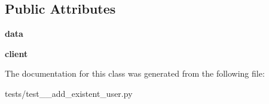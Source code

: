 \subsection*{Public Attributes}
\begin{DoxyCompactItemize}
\item 
\mbox{\label{classtests_1_1test__2__add__existent__user_1_1_test_user_routes_af61f77064477f9fc6be8a942b610274a}} 
{\bfseries data}
\item 
\mbox{\label{classtests_1_1test__2__add__existent__user_1_1_test_user_routes_ab663aac996acfbc5c9b89edf553a4c5b}} 
{\bfseries client}
\end{DoxyCompactItemize}


The documentation for this class was generated from the following file\+:\begin{DoxyCompactItemize}
\item 
tests/test\+\_\+\_\+add\+\_\+existent\+\_\+user.\+py\end{DoxyCompactItemize}
